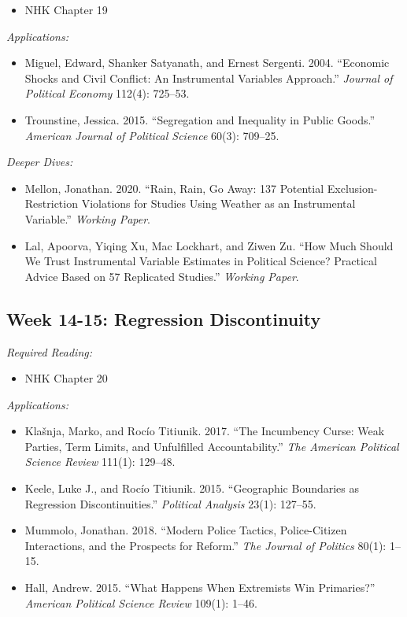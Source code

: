 \documentclass[11pt, letterpaper]{article}
\begin{document}
\begin{itemize}
	\item NHK Chapter 19
\end{itemize}

\noindent\textit{Applications:}

\begin{itemize}
	\item Miguel, Edward, Shanker Satyanath, and Ernest Sergenti. 2004. ``Economic Shocks and Civil Conflict: An Instrumental Variables Approach.'' \textit{Journal of Political Economy} 112(4): 725–53.
	\item Trounstine, Jessica. 2015. ``Segregation and Inequality in Public Goods.'' \textit{American Journal of Political Science} 60(3): 709–25.
\end{itemize}

\noindent \textit{Deeper Dives:}

\begin{itemize}
	\item Mellon, Jonathan. 2020. ``Rain, Rain, Go Away: 137 Potential Exclusion-Restriction Violations for Studies Using Weather as an Instrumental Variable.'' \textit{Working Paper}.
	\item Lal, Apoorva, Yiqing Xu, Mac Lockhart, and Ziwen Zu. ``How Much Should We Trust Instrumental Variable Estimates in Political Science? Practical Advice Based on 57 Replicated Studies.'' \textit{Working Paper}.
\end{itemize}


\subsection*{Week 14-15: Regression Discontinuity}

\textit{Required Reading:}

\begin{itemize}
	\item NHK Chapter 20
\end{itemize}


\noindent \textit{Applications:}

\begin{itemize}
	\item Klašnja, Marko, and Rocío Titiunik. 2017. ``The Incumbency Curse: Weak Parties, Term Limits, and Unfulfilled Accountability.'' \textit{The American Political Science Review} 111(1): 129–48.
	\item Keele, Luke J., and Rocío Titiunik. 2015. ``Geographic Boundaries as Regression Discontinuities.'' \textit{Political Analysis} 23(1): 127–55.
	\item Mummolo, Jonathan. 2018. ``Modern Police Tactics, Police-Citizen Interactions, and the Prospects for Reform.'' \textit{The Journal of Politics} 80(1): 1–15.
	\item Hall, Andrew. 2015. ``What Happens When Extremists Win Primaries?'' \textit{American Political Science Review} 109(1): 1–46.
\end{itemize}
\end{document}
